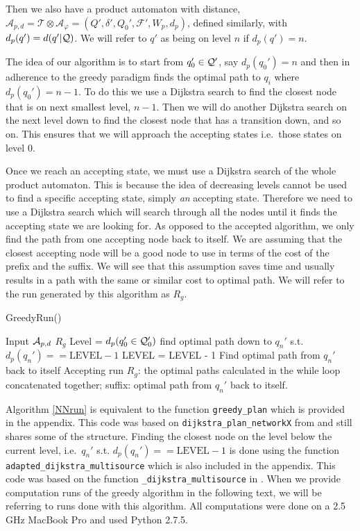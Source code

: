 Then we also have a product automaton with distance, $\mathcal{A}_{p,d} = \mathcal{T} \otimes \mathcal{A}_\varphi = (Q', \delta', Q_0', \mathcal{F}', W_p, d_p)$, defined similarly, with $d_p(q') = d(q'|\mathcal{Q})$. We will refer to $q'$ as being on level $n$ if $d_p(q') = n$.

The idea of our algorithm is to start from $q_0' \in \mathcal{Q}'$, say $d_p(q_0')=n$ and then in adherence to the greedy paradigm finds the optimal path to $q_i$ where $d_p(q_0')=n-1$. To do this we use a Dijkstra search to find the closest node that is on next smallest level, $n-1$. Then we will do another Dijkstra search on the next level down to find the closest node that has a transition down, and so on. This ensures that we will approach the accepting states i.e.\ those states on level 0. 

Once we reach an accepting state, we must use a Dijkstra search of the whole product automaton. This is because the idea of decreasing levels cannot be used to find a specific accepting state, simply \textit{an} accepting state. Therefore we need to use a Dijkstra search which will search through all the nodes until it finds the accepting state we are looking for. As opposed to the accepted algorithm, we only find the path from one accepting node back to itself. We are assuming that the closest accepting node will be a good node to use in terms of the cost of the prefix and the suffix. We will see that this assumption saves time and usually results in a path with the same or similar cost to optimal path. We will refer to the run generated by this algorithm as $R_{g}$.
\begin{algorithm}
\caption{GreedyRun()}\label{NNrun}
\begin{algorithmic}[1]
\Require Input $\mathcal{A}_{p,d}$
\Ensure $R_{g}$
\State Level = $d_p(q_0' \in \mathcal{Q}_0')$
\State find optimal path down to $q_n'$ s.t. $d_p(q_n')==\text{LEVEL}-1$ %
\State	LEVEL = LEVEL - 1
\EndWhile
\State Find optimal path from $q_n'$ back to itself
\State Accepting run $R_g$: the optimal paths calculated in the while loop concatenated together; suffix: optimal path from $q_n'$ back to itself.
\end{algorithmic}
\end{algorithm}

Algorithm \ref{NNrun} is equivalent to the function \texttt{greedy\_plan} which is provided in the appendix. This code was based on \texttt{dijkstra\_plan\_networkX} from \cite{pMasGit} and still shares some of the structure. Finding the closest node on the level below the current level, i.e.\ $q_n'$ s.t. $d_p(q_n')==\text{LEVEL}-1$ is done using the function \texttt{adapted\_dijkstra\_multisource} which is also included in the appendix. This code was based on the function  \texttt{\_dijkstra\_multisource} in \cite{schult08}. When we provide computation runs of the greedy algorithm in the following text, we will be referring to runs done with this algorithm. All computations were done on a 2.5 GHz MacBook Pro and used Python 2.7.5.%

